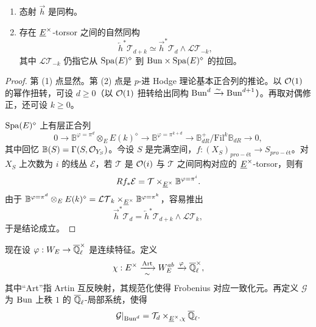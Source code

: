 \begin{proposition}\label{prop:9.1}
\begin{enumerate}[label=(\arabic*),leftmargin=*]
\item 态射 $\vec{h}$ 是同构。
\item 存在 $\underline{E}^\times$-torsor 之间的自然同构
\[
\overleftarrow{h}^* \mathcal{T}_{d+k} \simeq \vec{h}^* \mathcal{T}_d \wedge \mathcal{LT}_{-k},
\]
其中 $\mathcal{LT}_{-k}$ 仍指它从 $\mathrm{Spa}(E)^\diamond$ 到 $\mathrm{Bun} \times \mathrm{Spa}(E)^\diamond$ 的拉回。
\end{enumerate}
\end{proposition}

\begin{proof}
第 (1) 点显然。第 (2) 点是 $p$-进 Hodge 理论基本正合列的推论。以 $\mathcal{O}(1)$ 的幂作扭转，可设 $d \ge 0$（以 $\mathcal{O}(1)$ 扭转给出同构 $\mathrm{Bun}^d \xrightarrow{\sim} \mathrm{Bun}^{d+1}$）。再取对偶修正，还可设 $k \ge 0$。

$\mathrm{Spa}(E)^\diamond$ 上有层正合列
\[
0 \to \mathbb{B}^{\varphi=\pi^d} \otimes_E E(k)^\diamond \to \mathbb{B}^{\varphi=\pi^{k+d}} \to \mathbb{B}^+_{dR}/\mathrm{Fil}^k \mathbb{B}_{dR} \to 0,
\]
其中回忆 $\mathbb{B}(S) = \Gamma(S, \mathcal{O}_{Y_S})$。今设 $S$ 是完满空间，$f : (X_S)_{pro-\text{ét}} \to S_{pro-\text{ét}}$。对 $X_S$ 上次数为 $i$ 的线丛 $\mathcal{E}$，若 $\mathcal{T}$ 是 $\mathcal{O}(i)$ 与 $\mathcal{T}$ 之间同构对应的 $\underline{E}^\times$-torsor，则有
\[
Rf_* \mathcal{E} = \mathcal{T} \times_{\underline{E}^\times} \mathbb{B}^{\varphi=\pi^i} .
\]
由于 $\mathbb{B}^{\varphi=\pi^d} \otimes_E E(k)^\diamond = \mathcal{LT}_k \times_{\underline{E}^\times} \mathbb{B}^{\varphi=\pi^k}$，容易推出
\[
\vec{h}^* \mathcal{T}_d = \overleftarrow{h}^* \mathcal{T}_{d+k} \wedge \mathcal{LT}_k ,
\]
于是结论成立。
\end{proof}

\leavevmode{}现在设 $\varphi : W_E \to \overline{\mathbb{Q}}_\ell^\times$ 是连续特征。定义
\[
\chi : E^\times \xrightarrow[\sim]{\operatorname{Art}} W_E^{ab} \xrightarrow{\varphi} \overline{\mathbb{Q}}_\ell^\times,
\]
其中“Art”指 Artin 互反映射，其规范化使得 Frobenius 对应一致化元。再定义 $\mathcal{G}$ 为 $\mathrm{Bun}$ 上秩 $1$ 的 $\overline{\mathbb{Q}}_\ell$-局部系统，使得
\[
\mathcal{G}|_{\mathrm{Bun}^d} = \mathcal{T}_d \times_{\underline{E}^\times,\chi} \overline{\mathbb{Q}}_\ell .
\]

